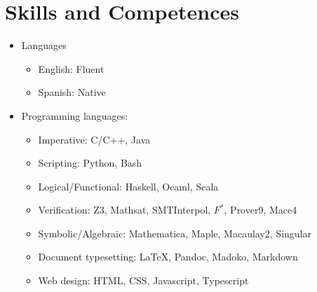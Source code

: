 \section{Skills and Competences}

\begin{itemize}
\item Languages
  \begin{itemize}
  \item English: Fluent
  \item Spanish: Native
  \end{itemize}
  
\item Programming languages:
  \begin{itemize}
  \item Imperative: C/C++, Java
  \item Scripting: Python, Bash
  \item Logical/Functional: Haskell, Ocaml, Scala
  \item Verification: Z3, Mathsat, SMTInterpol, 
    $F^{*}$, Prover9, Mace4 
  \item Symbolic/Algebraic: Mathematica, Maple, Macaulay2, Singular
  \item Document typesetting: \LaTeX, Pandoc, Madoko, Markdown
  \item Web design: HTML, CSS, Javascript, Typescript
  \end{itemize}
  
\end{itemize}

